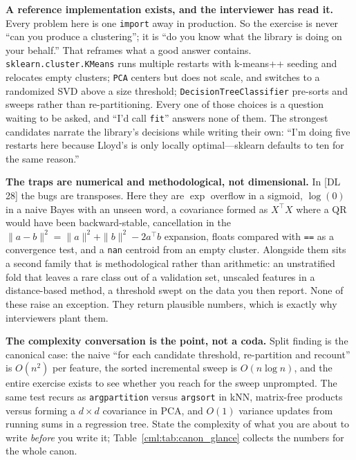 \textbf{A reference implementation exists, and the interviewer has read it.} Every problem here is one \texttt{import} away in production. So the exercise is never ``can you produce a clustering''; it is ``do you know what the library is doing on your behalf.'' That reframes what a good answer contains. \texttt{sklearn.cluster.KMeans} runs multiple restarts with k-means++ seeding and relocates empty clusters; \texttt{PCA} centers but does not scale, and switches to a randomized SVD above a size threshold; \texttt{DecisionTreeClassifier} pre-sorts and sweeps rather than re-partitioning. Every one of those choices is a question waiting to be asked, and ``I'd call \texttt{fit}'' answers none of them. The strongest candidates narrate the library's decisions while writing their own: ``I'm doing five restarts here because Lloyd's is only locally optimal---sklearn defaults to ten for the same reason.''

\textbf{The traps are numerical and methodological, not dimensional.} In [DL 28] the bugs are transposes. Here they are $\exp$ overflow in a sigmoid, $\log(0)$ in a naive Bayes with an unseen word, a covariance formed as $X^\top X$ where a QR would have been backward-stable, cancellation in the $\|a-b\|^2 = \|a\|^2 + \|b\|^2 - 2a^\top b$ expansion, floats compared with \texttt{==} as a convergence test, and a \texttt{nan} centroid from an empty cluster. Alongside them sits a second family that is methodological rather than arithmetic: an unstratified fold that leaves a rare class out of a validation set, unscaled features in a distance-based method, a threshold swept on the data you then report. None of these raise an exception. They return plausible numbers, which is exactly why interviewers plant them.

\textbf{The complexity conversation is the point, not a coda.} Split finding is the canonical case: the naive ``for each candidate threshold, re-partition and recount'' is $O(n^2)$ per feature, the sorted incremental sweep is $O(n \log n)$, and the entire exercise exists to see whether you reach for the sweep unprompted. The same test recurs as \texttt{argpartition} versus \texttt{argsort} in kNN, matrix-free products versus forming a $d \times d$ covariance in PCA, and $O(1)$ variance updates from running sums in a regression tree. State the complexity of what you are about to write \emph{before} you write it; Table~\ref{cml:tab:canon_glance} collects the numbers for the whole canon.

